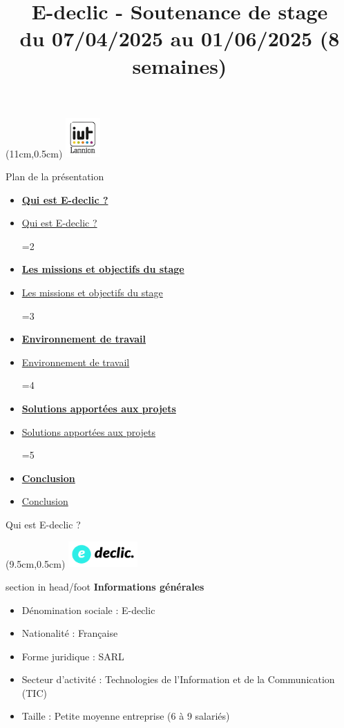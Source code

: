 \documentclass{beamer}
\title[IUT Lannion -- Soutenance Stage]{E-declic - Soutenance de stage \\ \normalsize du 07/04/2025 au 01/06/2025 (8 semaines)}
\author{\NomPrenom}
\institute{IUT de Lannion -- Département Informatique}
\date{\DateSoutenance}
\newcommand{\logoEdeclic}{
	\begin{textblock*}{2cm}(9.5cm,0.5cm)
  		\includegraphics[height=1cm]{../img/logo_e-declic.png}
	\end{textblock*}
}
\newcommand{\planLine}[4]{
  \ifnum#1=#2
    \item \hyperlink{#3}{\textbf{\large #4}}
  \else
    \item \hyperlink{#3}{#4}
  \fi
}
\newcommand{\planSlide}[1]{
  	\begin{frame}{Plan de la présentation}
  		\begin{center}
  			\begin{minipage}{1\textwidth}
				\begin{itemize}
      			\planLine{#1}{1}{organisation}{Qui est E-declic ?}
      			\planLine{#1}{2}{sujet}{Les missions et objectifs du stage}
      			\planLine{#1}{3}{environnement}{Environnement de travail}
      			\planLine{#1}{4}{realisation}{Solutions apportées aux projets}
      			\planLine{#1}{5}{conclusion}{Conclusion}
	    		\end{itemize}
  		\end{minipage}
	\end{center}
	\vfill
	\end{frame}
}
\begin{document}
\begin{frame}[plain]
	\begin{minipage}[t]{0.75\textwidth}
    		\titlepage
  	\end{minipage}
	\begin{textblock*}{2cm}(11cm,0.5cm)
    		\includegraphics[height=1.5cm]{../img/logo_iut.png}
	\end{textblock*}
\end{frame}

\planSlide{1}

\begin{frame}[label=organisation]{Qui est E-declic ?}
	\logoEdeclic

	\begin{beamercolorbox}[wd=\paperwidth,ht=1.5em,dp=0.5em,leftskip=0.5cm]{section in head/foot}
  		\large \textbf{Informations générales}
	\end{beamercolorbox}
	\vspace{0.5em}
	\begin{center}
  		\begin{minipage}{0.9\textwidth}
    			\begin{itemize}
      			\item Dénomination sociale : E-declic
				\item Nationalité : Française
      			\item Forme juridique : SARL
      			\item Secteur d'activité : Technologies de l'Information et de la Communication (TIC)
      			\item Taille : Petite moyenne entreprise (6 à 9 salariés)
    			\end{itemize}
  		\end{minipage}
	\end{center}
	\vfill
\end{frame}
\end{document}
